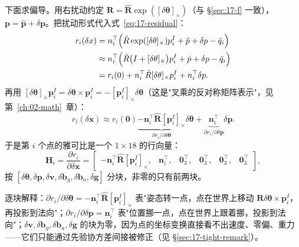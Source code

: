 下面求偏导。用右扰动约定 $\bm{R}=\hat{\bm{R}}\exp([\delta\bm{\theta}]_\times)$（与 \S\ref{sec:17-f} 一致），$\bm{p}=\hat{\bm{p}}+\delta\bm{p}$。把扰动形式代入式~\eqref{eq:17-residual}：
\begin{align}
  r_i(\delta x)&=n_i^{\top}\Bigl(\hat{R}\exp([\delta\theta]_\times)p_i^{I}+\hat{p}+\delta p-\bar{q}_i\Bigr)\nonumber\\
  &\approx n_i^{\top}\Bigl(\hat{R}\bigl(I+[\delta\theta]_\times\bigr)p_i^{I}+\hat{p}+\delta p-\bar{q}_i\Bigr)\nonumber\\
  &=r_i(0)+n_i^{\top}\hat{R}[\delta\theta]_\times p_i^{I}+n_i^{\top}\delta p.
\end{align}
再用 $[\delta\bm{\theta}]_\times\bm{p}_i^{I}=\delta\bm{\theta}\times\bm{p}_i^{I}=-[\bm{p}_i^{I}]_\times\delta\bm{\theta}$（这是"叉乘的反对称矩阵表示"，见第~\ref{ch:02-math}~章）：
\begin{equation}\label{eq:17-jacobian}
  r_i(\delta\bm{x})\approx r_i(\bm{0})
  \underbrace{-\bm{n}_i^{\top}\hat{\bm{R}}[\bm{p}_i^{I}]_\times}_{\partial r_i/\partial\delta\bm{\theta}}\delta\bm{\theta}
  +\underbrace{\bm{n}_i^{\top}}_{\partial r_i/\partial\delta\bm{p}}\delta\bm{p}.
\end{equation}
于是第 $i$ 个点的雅可比是一个 $1\times18$ 的行向量：
\begin{equation}\label{eq:17-Hi}
  \boxed{
  \bm{H}_i=\frac{\partial r_i}{\partial\delta\bm{x}}
  =\begin{bmatrix}
    -\bm{n}_i^{\top}\hat{\bm{R}}[\bm{p}_i^{I}]_\times, & \bm{n}_i^{\top}, & \bm{0}_{3}^{\top}, & \bm{0}_{3}^{\top}, & \bm{0}_{3}^{\top}, & \bm{0}_{3}^{\top}
  \end{bmatrix},}
\end{equation}
按 $[\delta\bm{\theta},\delta\bm{p},\delta\bm{v},\delta\bm{b}_g,\delta\bm{b}_a,\delta\bm{g}]$ 分块，非零的只有前两块。

逐块解释：$\partial r_i/\partial\delta\bm{\theta}=-\bm{n}_i^{\top}\hat{\bm{R}}[\bm{p}_i^{I}]_\times$ 表"姿态转一点，点在世界上移动 $\bm{R}\delta\bm{\theta}\times\bm{p}_i^{I}$，再投影到法向"；$\partial r_i/\partial\delta\bm{p}=\bm{n}_i^{\top}$ 表"位置挪一点，点在世界上跟着挪，投影到法向"；$\delta\bm{v},\delta\bm{b}_g,\delta\bm{b}_a,\delta\bm{g}$ 的块为零，因为点的坐标变换直接看不出速度、零偏、重力——它们只能通过先验协方差间接被修正（见 \S\ref{sec:17-tight-remark}）。

